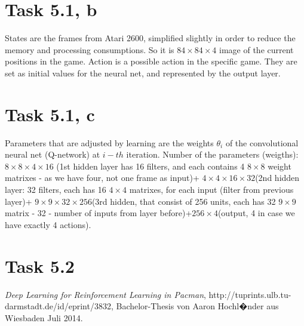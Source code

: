 \documentclass[english]{scrartcl}
\begin{document}
\section*{Task 5.1, b}
States are the frames from Atari 2600, simplified slightly in order to reduce the memory and processing consumptions. So it is $84\times84\times4$ image of the current positions in the game. Action is a possible action in the specific game. They are set as initial values for the neural net, and represented by the output layer.
\section*{Task 5.1, c}
Parameters that are adjusted by learning are the weights $\theta_{i}$ of the convolutional neural net (Q-network) at $i-th$ iteration. Number of the parameters (weigths): $8\times 8\times 4 \times 16$ (1st hidden layer has 16 filters, and each contains 4 $8\times 8$ weight matrixes - as we have four, not one frame as input)+ $4\times 4\times 16 \times 32$(2nd hidden layer: 32 filters, each has 16 $4\times 4$ matrixes, for each input (filter from previous layer)+ $9\times 9\times 32\times 256$(3rd hidden, that consist of 256 units, each has 32 $9\times 9$ matrix - 32 - number of inputs from layer before)+$256\times 4$(output, 4 in case we have exactly 4 actions).
\section*{Task 5.2}
\cite{deep-learning}

\begin{thebibliography}{9}

  \emph{Deep Learning for Reinforcement Learning in Pacman},
   http://tuprints.ulb.tu-darmstadt.de/id/eprint/3832,
  Bachelor-Thesis von Aaron Hochl�nder aus Wiesbaden
  Juli 2014.

\end{thebibliography}
\end{document}
